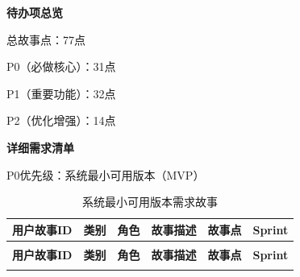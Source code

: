 \begin{levellist}
    \item \textbf{待办项总览}
    \begin{levellist}
        \item 总故事点：77点
        \item P0（必做核心）：31点
        \item P1（重要功能）：32点
        \item P2（优化增强）：14点
    \end{levellist}

    \item \textbf{详细需求清单}
    \begin{levellist}
        \item P0优先级：系统最小可用版本（MVP）

        \begin{longtable}{>{\centering\arraybackslash}m{2.5cm} >{\centering\arraybackslash}m{1cm} >{\centering\arraybackslash}m{1cm} >{\centering\arraybackslash}m{5cm} >{\centering\arraybackslash}m{1.5cm} >{\centering\arraybackslash}m{1.5cm}}

            \caption{系统最小可用版本需求故事} \label{tab:training}                                                                          \\

            \toprule
            \textbf{用户故事ID} & \textbf{类别} & \textbf{角色} & \textbf{故事描述}                         & \textbf{故事点} & \textbf{Sprint} \\
            \midrule
            \endfirsthead

            \multicolumn{6}{c}{{\tablename\ \thetable{} 续表}}                                                                     \\
            \toprule
            \textbf{用户故事ID} & \textbf{类别} & \textbf{角色} & \textbf{故事描述}                         & \textbf{故事点} & \textbf{Sprint} \\
            \midrule
            \endhead

            \bottomrule
            \endfoot


\end{longtable}
\end{levellist}
\end{levellist}

